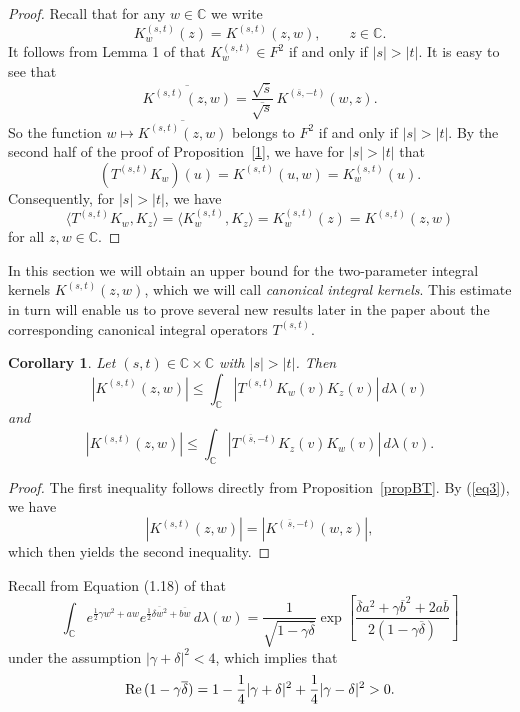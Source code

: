 \documentclass[reqno]{amsart}
\newtheorem{corollary}[theorem]{Corollary}
\newcommand{\C}{{\mathbb C}}
\newcommand{\inc}{\int_{\C}}
\DeclareMathOperator{\re}{{\rm Re}\,}
\begin{document}
\begin{proof}
Recall that for any $w\in\C$ we write
$$K^{(s,t)}_w(z)=K^{(s,t)}(z,w),\qquad z\in\C.$$
It follows from Lemma 1 of \cite{DZ3} that $K^{(s,t)}_w\in F^2$ if and
only if $|s|>|t|$. It is easy to see that
\begin{equation}\label{eq3}
\overline{K^{(s,t)}(z,w)}=\frac{\sqrt{\overline s}}{\overline{\sqrt s}}
\,K^{(\overline s,-t)}(w,z).
\end{equation}
So the function $w\mapsto\overline{K^{(s,t)}(z,w)}$ belongs to
$F^2$ if and only if $|s|>|t|$. By the second half of the proof of
Proposition~\ref{1}, we have for $|s|>|t|$ that
\begin{equation}\label{eqTKw}
\left(T^{(s,t)}K_w\right)(u)=K^{(s,t)}(u,w)=K^{(s,t)}_w(u).
\end{equation}
Consequently, for $|s|>|t|$, we have
$$\langle T^{(s,t)}K_w, K_z\rangle=\langle K^{(s,t)}_w, K_z\rangle
=K^{(s,t)}_w(z)=K^{(s,t)}(z,w)$$
for all $z,w\in\C$.
\end{proof}

In this section we will obtain an upper bound for the two-parameter
integral kernels $K^{(s,t)}(z,w)$, which we will call {\it canonical integral
kernels}. This estimate in turn will enable us to prove several new results
later in the paper about the corresponding canonical integral operators
$T^{(s,t)}$.

\begin{corollary}\label{CorKleq}
Let $(s, t)\in\C\times\C$ with $|s|>|t|$. Then
$$\left|K^{(s,t)}(z,w)\right|\le\inc\left|T^{(s,t)}K_w(v)K_z(v)
\right|\,d\lambda(v)$$
and
$$\left|K^{(s,t)}(z,w)\right|\le\inc\left|{T^{(\overline{s},-t)}
K_z(v)K_w(v)}\right|\,d\lambda(v).$$
\end{corollary}

\begin{proof}
The first inequality follows directly from Proposition~\ref{propBT}.
By (\ref{eq3}), we have
$$\left|K^{(s,t)}(z,w)\right|=\left|K^{(\,\overline{s},-{t})}(w,z)\right|,$$
which then yields the second inequality.
\end{proof}

Recall from Equation (1.18) of \cite{B1} that
\begin{equation}\label{eqIC}
\inc e^{\frac{1}{2}\gamma w^{2}+aw}e^{\frac{1}{2}\overline{\delta w^2}
+\overline{bw}}\,d\lambda(w)
=\frac{1}{\sqrt{1-\gamma\overline{\delta}}}
\exp\left[\frac{\overline{\delta}a^{2}+\gamma \overline{b}^{2}
+2a\overline{b}}{2(1-\gamma\overline{\delta})}\right]
\end{equation}
under the assumption $|\gamma+\delta|^{2}<4$, which implies that
$$\re(1-\gamma\overline\delta)=1-\frac14|\gamma+\delta|^2+\frac14|
\gamma-\delta|^2>0.$$
\end{document}
